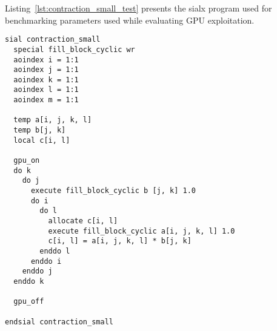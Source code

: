 Listing~\ref{lst:contraction_small_test} presents the sialx program used for benchmarking
parameters used while evaluating GPU exploitation.

\begin{lstlisting}[caption={\texttt{contraction\_small\_test.sialx}: sialx program to benchmark GPU exploitation},
  label={lst:contraction_small_test}]
sial contraction_small
  special fill_block_cyclic wr
  aoindex i = 1:1
  aoindex j = 1:1
  aoindex k = 1:1
  aoindex l = 1:1
  aoindex m = 1:1

  temp a[i, j, k, l]
  temp b[j, k]
  local c[i, l]

  gpu_on
  do k
    do j
      execute fill_block_cyclic b [j, k] 1.0
      do i
        do l
          allocate c[i, l]
          execute fill_block_cyclic a[i, j, k, l] 1.0
          c[i, l] = a[i, j, k, l] * b[j, k]
        enddo l
      enddo i
    enddo j
  enddo k

  gpu_off

endsial contraction_small
\end{lstlisting}